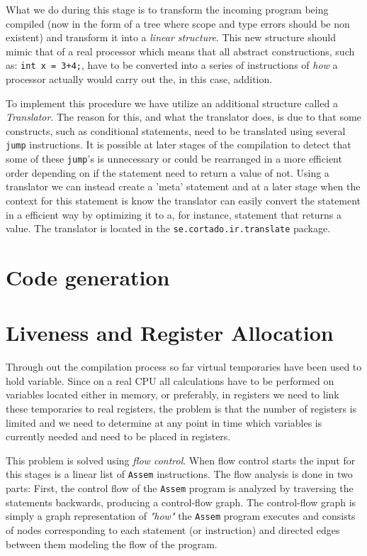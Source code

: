 \documentclass[11pt]{amsart}
\begin{document}
What we do during this stage is to transform the incoming program being compiled (now in the form of a tree where scope and type errors should be non existent) and transform it into a \textit{linear structure}. This new structure should mimic that of a real processor which means that all abstract constructions, such as: \texttt{int x = 3+4;}, have to be converted into a series of instructions of \textit{how} a processor actually would carry out the, in this case, addition.

To implement this procedure we have utilize an additional structure called a \textit{Translator}. The reason for this, and what the translator does, is due to that some constructs, such as conditional statements, need to be translated using several \texttt{jump} instructions. It is possible at later stages of the compilation to detect that some of these \texttt{jump}'s is unnecessary or could be rearranged in a more efficient order depending on if the statement need to return a value of not. Using a translator we can instead create a 'meta' statement and at a later stage when the context for this statement is know the translator can easily convert the statement in a efficient way by optimizing it to a, for instance, statement that returns a value. The translator is located in the \texttt{se.cortado.ir.translate} package.

\section{Code generation}


\section{Liveness and Register Allocation}
Through out the compilation process so far virtual temporaries have been used to hold variable. Since on a real CPU all calculations have to be performed on variables located either in memory, or preferably, in registers we need to link these temporaries to real registers, the problem is that the number of registers is limited and we need to determine at any point in time which variables is currently needed and need to be placed in registers.

This problem is solved using \textit{flow control}. When flow control starts the input for this stages is a linear list of \texttt{Assem} instructions. The flow analysis is done in two parts: First, the control flow of the \texttt{Assem} program is analyzed by traversing the statements backwards, producing a control-flow graph. The control-flow graph is simply a graph representation of \textit{"how"} the \texttt{Assem} program executes and consists of nodes corresponding to each statement (or instruction) and directed edges between them modeling the flow of the program.
\end{document}
